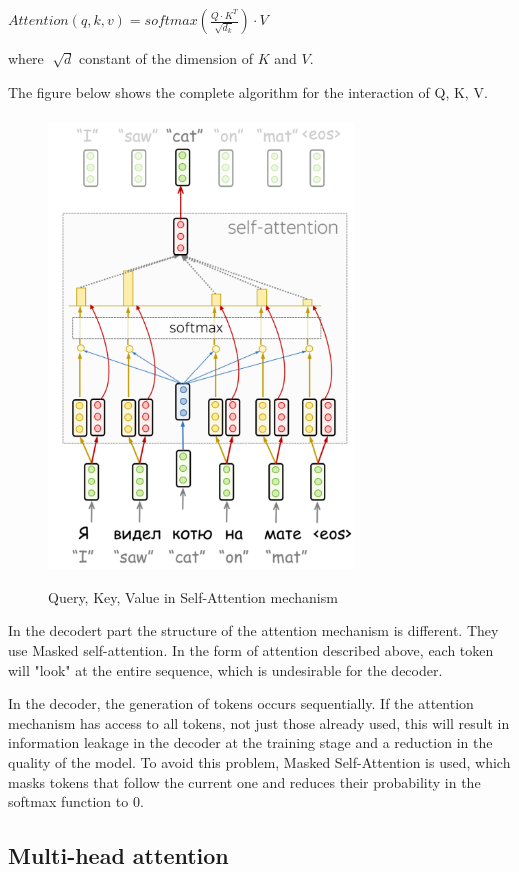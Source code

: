 \documentclass[PMI,VKR]{HSEUniversity}
\begin{document}
\begin{center}
    $Attention(q, k, v) = softmax(\frac{Q \cdot K^T}{\sqrt{d_k}}) \cdot V $
\end{center}
where $\sqrt[]{d}$ constant of the dimension of $K$ and $V$. 

The figure below shows the complete algorithm for the interaction of Q, K, V.

\begin{figure}[h]
    \centering
    \includegraphics[scale=1]{img/query-key-value.png}
    \caption{Query, Key, Value in Self-Attention mechanism}
\end{figure}

In the decodert part the structure of the attention mechanism is different. 
They use Masked self-attention. In the form of attention described above, each token will "look" at the entire sequence, which is undesirable for the decoder. 

In the decoder, the generation of tokens occurs sequentially. If the attention mechanism has access to all tokens, not just those already used, this will result in information leakage in the decoder at the training stage and a reduction in the quality of the model.
To avoid this problem, Masked Self-Attention is used, which masks tokens that follow the current one and reduces their probability in the softmax function to 0.

\subsection{Multi-head attention}
\end{document}
